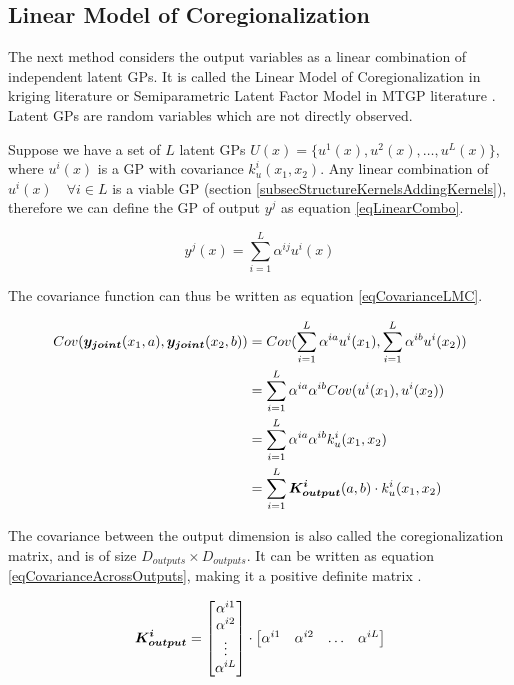 \subsection{Linear Model of Coregionalization}\label{subsecLMC}
The next method considers the output variables as a linear combination of independent latent GPs. It is called the Linear Model of Coregionalization in kriging literature \cite{goovaerts1997geostatistics} or Semiparametric Latent Factor Model in MTGP literature \cite{seeger2005semiparametric}. Latent GPs are random variables which are not directly observed. 

Suppose we have a set of $L$ latent GPs $U(x) = \{u^{1}(x), u^2(x), \ldots, u^{L}(x)\}$, where $u^{i}(x)$ is a GP with covariance $k_{u}^{i}(x_{1}, x_{2})$. Any linear combination of $u^{i}(x) \quad \forall i \in L$ is a viable GP (section \ref{subsecStructureKernelsAddingKernels}), therefore we can define the GP of output $y^{j}$ as equation \ref{eqLinearCombo}. 

\begin{equation}\label{eqLinearCombo}
y^{j}(x) = \sum_{i=1}^{L} \alpha^{ij}u^{i}(x)
\end{equation}

The covariance function can thus be written as equation \ref{eqCovarianceLMC}.

\begin{equation}\label{eqCovarianceLMC} 
 \begin{aligned}
Cov(\boldsymbol{y_{joint}}(x_{1}, a), \boldsymbol{y_{joint}}(x_{2}, b)) & = Cov(\sum_{i=1}^{L} \alpha^{ia}u^{i}(x_{1}), \sum_{i=1}^{L} \alpha^{ib}u^{i}(x_{2})) \\ 
& = \sum_{i=1}^{L} \alpha^{ia}\alpha^{ib} Cov(u^{i}(x_{1}), u^{i}(x_{2})) \\ 
& = \sum_{i=1}^{L} \alpha^{ia}\alpha^{ib}k_{u}^{i}(x_{1}, x_{2}) \\ 
& = \sum_{i=1}^{L} \boldsymbol{K_{output}^{i}}(a, b) \cdot k_{u}^{i}(x_{1}, x_{2})
 \end{aligned}
\end{equation}

The covariance between the output dimension  is also called the coregionalization matrix, and is of size $D_{outputs} \times D_{outputs}$. It can be written as equation \ref{eqCovarianceAcrossOutputs}, making it a positive definite matrix \cite{mercer1909functions}.

\begin{equation}\label{eqCovarianceAcrossOutputs}
\boldsymbol{K_{output}^{i}} = \begin{bmatrix}
\alpha^{i1}\\ 
\alpha^{i2}\\ 
\vdots\\ 
\alpha^{iL}
\end{bmatrix} \cdot \begin{bmatrix}
\alpha^{i1} & \alpha^{i2} & \ldots & \alpha^{iL}
\end{bmatrix}
\end{equation}

